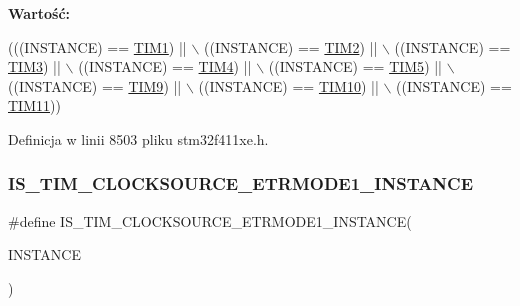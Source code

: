 {\bfseries Wartość\+:}
\begin{DoxyCode}
(((INSTANCE) == \hyperlink{group___peripheral__declaration_ga2e87451fea8dc9380056d3cfc5ed81fb}{TIM1})   || \(\backslash\)
                                                  ((INSTANCE) == \hyperlink{group___peripheral__declaration_ga3cfac9f2e43673f790f8668d48b4b92b}{TIM2})   || \(\backslash\)
                                                  ((INSTANCE) == \hyperlink{group___peripheral__declaration_ga61ee4c391385607d7af432b63905fcc9}{TIM3})   || \(\backslash\)
                                                  ((INSTANCE) == \hyperlink{group___peripheral__declaration_ga91a09bad8bdc7a1cb3d85cf49c94c8ec}{TIM4})   || \(\backslash\)
                                                  ((INSTANCE) == \hyperlink{group___peripheral__declaration_ga5125ff6a23a2ed66e2e19bd196128c14}{TIM5})   || \(\backslash\)
                                                  ((INSTANCE) == \hyperlink{group___peripheral__declaration_gaf52b4b4c36110a0addfa98059f54a50e}{TIM9})   || \(\backslash\)
                                                  ((INSTANCE) == \hyperlink{group___peripheral__declaration_ga46b2ad3f5f506f0f8df0d2ec3e767267}{TIM10})  || \(\backslash\)
                                                  ((INSTANCE) == \hyperlink{group___peripheral__declaration_gacfd11ef966c7165f57e2cebe0abc71ad}{TIM11}))
\end{DoxyCode}


Definicja w linii 8503 pliku stm32f411xe.\+h.

\mbox{\label{group___exported__macros_ga0ca20886f56bf7611ad511433b9caade}} 
\subsubsection{\texorpdfstring{I\+S\+\_\+\+T\+I\+M\+\_\+\+C\+L\+O\+C\+K\+S\+O\+U\+R\+C\+E\+\_\+\+E\+T\+R\+M\+O\+D\+E1\+\_\+\+I\+N\+S\+T\+A\+N\+CE}{IS\_TIM\_CLOCKSOURCE\_ETRMODE1\_INSTANCE}}
{\footnotesize\ttfamily \#define I\+S\+\_\+\+T\+I\+M\+\_\+\+C\+L\+O\+C\+K\+S\+O\+U\+R\+C\+E\+\_\+\+E\+T\+R\+M\+O\+D\+E1\+\_\+\+I\+N\+S\+T\+A\+N\+CE(\begin{DoxyParamCaption}\item[{}]{I\+N\+S\+T\+A\+N\+CE }\end{DoxyParamCaption})}

